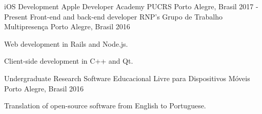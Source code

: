 \begin{cventries}
  \cventry
    {iOS Development}
    {Apple Developer Academy PUCRS}
    {Porto Alegre, Brasil}
    {2017 - Present}
    {}
  \cventry
    {Front-end and back-end developer}
    {RNP's Grupo de Trabalho Multipresença}
    {Porto Alegre, Brasil}
    {2016}
    {
      \begin{cvitems}
        \item {Web development in Rails and Node.js.}
        \item {Client-side development in C++ and Qt.}
      \end{cvitems}
    }
  \cventry
    {Undergraduate Research}
    {Software Educacional Livre para Dispositivos Móveis}
    {Porto Alegre, Brasil}
    {2016}
    {
      \begin{cvitems}
        \item {Translation of open-source software from English to Portuguese.}
      \end{cvitems}
    }
\end{cventries}
